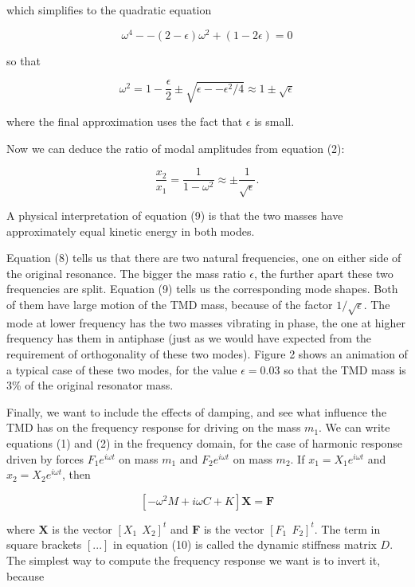  which simplifies to the quadratic equation 

  $$\omega^4 -- (2-\epsilon) \omega^2 + (1-2\epsilon) = 0 \tag{7}$$ 

  so that 

  $$\omega^2 = 1 -\dfrac{\epsilon}{2} \pm \sqrt{\epsilon -- \epsilon^2 /4} 
  \approx 1 \pm \sqrt{\epsilon} \tag{8}$$ 

  where the final approximation uses the fact that $\epsilon$ is small. 

  Now we can deduce the ratio of modal amplitudes from equation (2): 

  $$\dfrac{x_2}{x_1} = \dfrac{1}{1-\omega^2} \approx \pm 
  \dfrac{1}{\sqrt{\epsilon}} . \tag{9}$$ 

  A physical interpretation of equation (9) is that the two masses have 
  approximately equal kinetic energy in both modes. 

  Equation (8) tells us that there are two natural frequencies, one on either 
  side of the original resonance. The bigger the mass ratio $\epsilon$, the 
  further apart these two frequencies are split. Equation (9) tells us the 
  corresponding mode shapes. Both of them have large motion of the TMD mass, 
  because of the factor $1/\sqrt{\epsilon}$. The mode at lower frequency has 
  the two masses vibrating in phase, the one at higher frequency has them in 
  antiphase (just as we would have expected from the requirement of 
  orthogonality of these two modes). Figure 2 shows an animation of a typical 
  case of these two modes, for the value $\epsilon = 0.03$ so that the TMD mass 
  is 3\% of the original resonator mass. 

  Finally, we want to include the effects of damping, and see what influence 
  the TMD has on the frequency response for driving on the mass $m_1$. We can 
  write equations (1) and (2) in the frequency domain, for the case of harmonic 
  response driven by forces $F_1 e^{i \omega t}$ on mass $m_1$ and $F_2 e^{i 
  \omega t}$ on mass $m_2$. If $x_1 =X_1 e^{i \omega t}$ and $x_2 =X_2 e^{i 
  \omega t}$, then 

  $$[-\omega^2 M + i \omega C +K] \textbf{X} = \textbf{F} \tag{10}$$ 

  where $\textbf{X}$ is the vector $[X_1~~X_2]^t$ and $\textbf{F}$ is the 
  vector $[F_1~~F_2]^t$. The term in square brackets $[...]$ in equation (10) 
  is called the dynamic stiffness matrix $D$. The simplest way to compute the 
  frequency response we want is to invert it, because 

